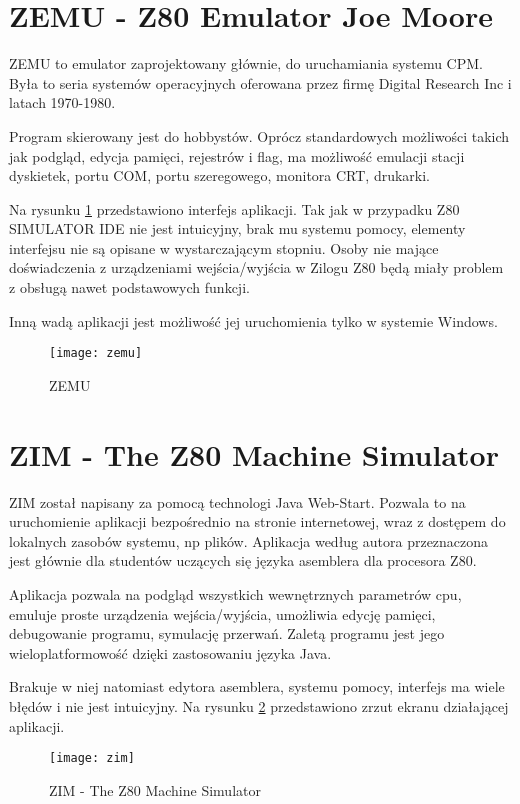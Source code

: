	
	\section{ZEMU - Z80 Emulator Joe Moore}
	ZEMU to emulator zaprojektowany głównie, do uruchamiania systemu CPM. Była to seria systemów operacyjnych oferowana przez firmę Digital Research Inc i latach 1970-1980\cite{cpm}.
	
	Program skierowany jest do hobbystów. Oprócz standardowych możliwości takich jak podgląd, edycja pamięci, rejestrów i flag, ma możliwość emulacji stacji dyskietek, portu COM, portu szeregowego, monitora CRT, drukarki.    
	
	Na rysunku \ref{img:zemu} przedstawiono interfejs aplikacji. Tak jak w przypadku Z80 SIMULATOR IDE nie jest intuicyjny, brak mu systemu pomocy, elementy interfejsu nie są opisane w wystarczającym stopniu. Osoby nie mające doświadczenia z urządzeniami wejścia/wyjścia w Zilogu Z80 będą miały problem z obsługą nawet podstawowych funkcji.
	
	Inną wadą aplikacji jest możliwość jej uruchomienia tylko w systemie Windows. 
	
	\begin{figure}[h]		
		\centering
		\texttt{[image: zemu]}
		\caption{ZEMU \cite{zemuImg}}
		\label{img:zemu}
	\end{figure}
	
	 \section{ZIM - The Z80 Machine Simulator}
	ZIM został napisany za pomocą technologi Java Web-Start. Pozwala to na uruchomienie aplikacji bezpośrednio na stronie internetowej, wraz z dostępem do lokalnych zasobów systemu, np plików\cite{zim}. 
	Aplikacja według autora przeznaczona jest głównie dla studentów uczących się języka asemblera dla procesora Z80\cite{zimPurpose}.
	
	Aplikacja pozwala na podgląd wszystkich wewnętrznych parametrów cpu, emuluje proste urządzenia wejścia/wyjścia, umożliwia edycję pamięci, debugowanie programu, symulację przerwań. Zaletą programu jest jego wieloplatformowość dzięki zastosowaniu języka Java.
	
	Brakuje w niej natomiast edytora asemblera, systemu pomocy, interfejs ma wiele błędów i nie jest intuicyjny. Na rysunku \ref{img:zim} przedstawiono zrzut ekranu działającej aplikacji.
	
	\begin{figure}[h]		
		\centering
		\texttt{[image: zim]}
		\caption{ZIM - The Z80 Machine Simulator \cite{zimImg}}
		\label{img:zim}
	\end{figure}
	
